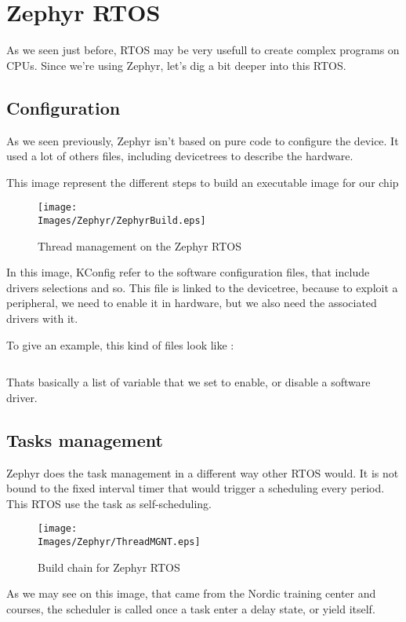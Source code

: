 \section{Zephyr RTOS}
As we seen just before, RTOS may be very usefull to create complex programs on CPUs.
Since we're using Zephyr, let's dig a bit deeper into this RTOS.

\subsection{Configuration}
As we seen previously, Zephyr isn't based on pure code to configure the device. It used 
a lot of others files, including devicetrees to describe the hardware.

This image represent the different steps to build an executable image for our chip
\begin{figure}[!hbt]
    \centering
    \texttt{[image: \\Images/Zephyr/ZephyrBuild.eps]}
    \caption{Thread management on the Zephyr RTOS}
\end{figure}
\FloatBarrier

In this image, KConfig refer to the software configuration files, that include 
drivers selections and so. This file is linked to the devicetree, because to 
exploit a peripheral, we need to enable it in hardware, but we also need the associated
drivers with it.

To give an example, this kind of files look like : 
\inputminted[linenos, firstline=32, lastline=70]{kconfig}{\Conf/prj.conf}

Thats basically a list of variable that we set to enable, or disable a software driver.

\subsection{Tasks management}
Zephyr does the task management in a different way other RTOS would. It is not bound to 
the fixed interval timer that would trigger a scheduling every period. This RTOS use the
task as self-scheduling.

\begin{figure}[!hbt]
    \centering
    \texttt{[image: \\Images/Zephyr/ThreadMGNT.eps]}
    \caption{Build chain for Zephyr RTOS}
\end{figure}
\FloatBarrier

As we may see on this image, that came from the Nordic training center \cite{NordicFundamentals} 
and \cite{NordicAdvanced} courses, the scheduler is called once a task enter a delay state, or 
yield itself.

